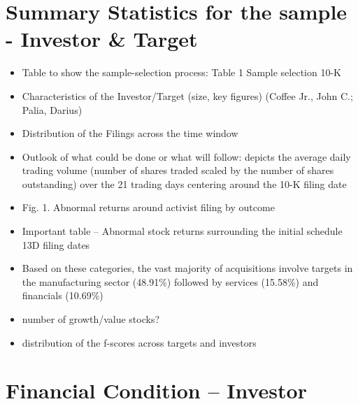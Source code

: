 \documentclass[12pt]{article}
\begin{document}
\section{Summary Statistics for the sample - Investor \& Target}

    \begin{itemize}

        \item Table to show the sample-selection process: Table 1 Sample selection 10-K \citep{You2009}

        \item Characteristics of the Investor/Target (size, key figures) (Coffee Jr., John C.; Palia, Darius)

        \item Distribution of the Filings across the time window

        \item Outlook of what could be done or what will follow: depicts the average daily trading volume (number of shares traded scaled by the number of shares outstanding) over the 21 trading days centering around the 10-K filing date \citep{You2009}

        \item Fig. 1. Abnormal returns around activist filing by outcome \citep[p. 370]{Greenwood2009}

        \item Important table -- Abnormal stock returns surrounding the initial schedule 13D filing dates \citep{Klein2009}

        \item Based on these categories, the vast majority of acquisitions involve targets in the manufacturing sector (48.91\%) followed by services (15.58\%) and financials (10.69\%) \citep{Akhigbe2007}

        \item number of growth/value stocks? 

        \item distribution of the f-scores across targets and investors

    \end{itemize}

\section{Financial Condition -- Investor}
\end{document}
